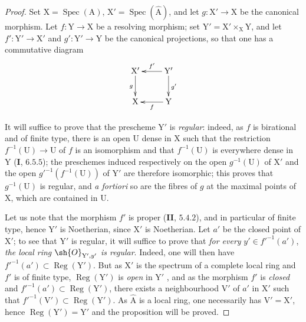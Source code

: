 \begin{proof}
Set $\mathrm{X}=\operatorname{Spec}(\mathrm{A})$, $\mathrm{X}'=\operatorname{Spec}(\widehat{\mathrm{A}})$, and let $g:\mathrm{X}'\to\mathrm{X}$ be the canonical morphism. Let $f:\mathrm{Y}\to\mathrm{X}$ be a resolving morphism; set $\mathrm{Y}'=\mathrm{X}'\times_\mathrm{X}\mathrm{Y}$, and let $f':\mathrm{Y}'\to\mathrm{X}'$ and $g':\mathrm{Y}'\to\mathrm{Y}$ be the canonical projections, so that one has a commutative diagram
\[
  \xymatrix{
    \mathrm{X}' \ar[d]_g & \mathrm{Y}' \ar[l]_{f'} \ar[d]^{g'} \\
    \mathrm{X} & \mathrm{Y} \ar[l]^f
  }
\]

It will suffice to prove that the prescheme $\mathrm{Y}'$ is \emph{regular}: indeed, as $f$ is birational and of finite type, there is an open $\mathrm{U}$ dense in $\mathrm{X}$ such that the restriction $f^{-1}(\mathrm{U})\to\mathrm{U}$ of $f$ is an isomorphism and that $f^{-1}(\mathrm{U})$ is everywhere dense in $\mathrm{Y}$ (\textbf{I}, $6.5.5$); the preschemes induced respectively on the open $g^{-1}(\mathrm{U})$ of $\mathrm{X}'$ and the open $g'^{-1}(f^{-1}(\mathrm{U}))$ of $\mathrm{Y}'$ are therefore isomorphic; this proves that $g^{-1}(\mathrm{U})$ is regular, and \emph{a fortiori} so are the fibres of $g$ at the maximal points of $\mathrm{X}$, which are contained in $\mathrm{U}$.


Let us note that the morphism $f'$ is proper (\textbf{II}, $5.4.2$), and in particular of finite type, hence $\mathrm{Y}'$ is Noetherian, since $\mathrm{X}'$ is Noetherian. Let $a'$ be the closed point of $\mathrm{X}'$; to see that $\mathrm{Y}'$ is regular, it will suffice to prove that \emph{for every} $y'\in f'^{-1}(a')$, \emph{the local ring} $\sh{O}_{\mathrm{Y}',y'}$ \emph{is regular}. Indeed, one will then have $f'^{-1}(a')\subset\operatorname{Reg}(\mathrm{Y}')$. But as $\mathrm{X}'$ is the spectrum of a complete local ring and $f'$ is of finite type, $\operatorname{Reg}(\mathrm{Y}')$ is \emph{open} in $\mathrm{Y}'$ , and as the morphism $f'$ is \emph{closed} and $f'^{-1}(a')\subset\operatorname{Reg}(\mathrm{Y}')$, there exists a neighbourhood $\mathrm{V}'$ of $a'$ in $\mathrm{X}'$ such that $f'^{-1}(\mathrm{V}')\subset\operatorname{Reg}(\mathrm{Y}')$. As $\widehat{\mathrm{A}}$ is a local ring, one necessarily has $\mathrm{V}'=\mathrm{X}'$, hence $\operatorname{Reg}(\mathrm{Y}')=\mathrm{Y}'$ and the proposition will be proved.


\end{proof}
